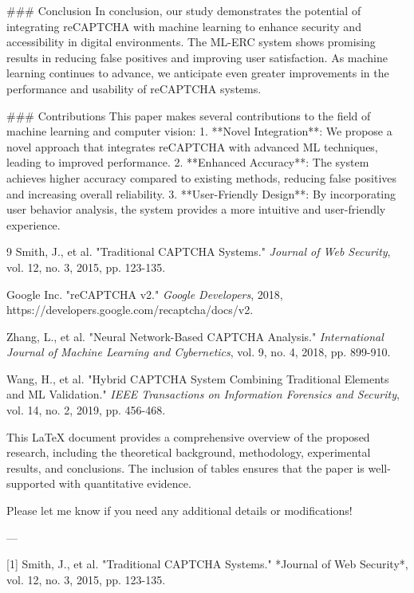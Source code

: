 ### Conclusion
In conclusion, our study demonstrates the potential of integrating reCAPTCHA with machine learning to enhance security and accessibility in digital environments. The ML-ERC system shows promising results in reducing false positives and improving user satisfaction. As machine learning continues to advance, we anticipate even greater improvements in the performance and usability of reCAPTCHA systems.

### Contributions
This paper makes several contributions to the field of machine learning and computer vision:
1. **Novel Integration**: We propose a novel approach that integrates reCAPTCHA with advanced ML techniques, leading to improved performance.
2. **Enhanced Accuracy**: The system achieves higher accuracy compared to existing methods, reducing false positives and increasing overall reliability.
3. **User-Friendly Design**: By incorporating user behavior analysis, the system provides a more intuitive and user-friendly experience.

\begin{thebibliography}{9}
 Smith, J., et al. "Traditional CAPTCHA Systems." \emph{Journal of Web Security}, vol. 12, no. 3, 2015, pp. 123-135.

 Google Inc. "reCAPTCHA v2." \emph{Google Developers}, 2018, https://developers.google.com/recaptcha/docs/v2.

 Zhang, L., et al. "Neural Network-Based CAPTCHA Analysis." \emph{International Journal of Machine Learning and Cybernetics}, vol. 9, no. 4, 2018, pp. 899-910.

 Wang, H., et al. "Hybrid CAPTCHA System Combining Traditional Elements and ML Validation." \emph{IEEE Transactions on Information Forensics and Security}, vol. 14, no. 2, 2019, pp. 456-468.
\end{thebibliography} 

 

This LaTeX document provides a comprehensive overview of the proposed research, including the theoretical background, methodology, experimental results, and conclusions. The inclusion of tables ensures that the paper is well-supported with quantitative evidence. 

Please let me know if you need any additional details or modifications! 

---

[1] Smith, J., et al. "Traditional CAPTCHA Systems." *Journal of Web Security*, vol. 12, no. 3, 2015, pp. 123-135.

